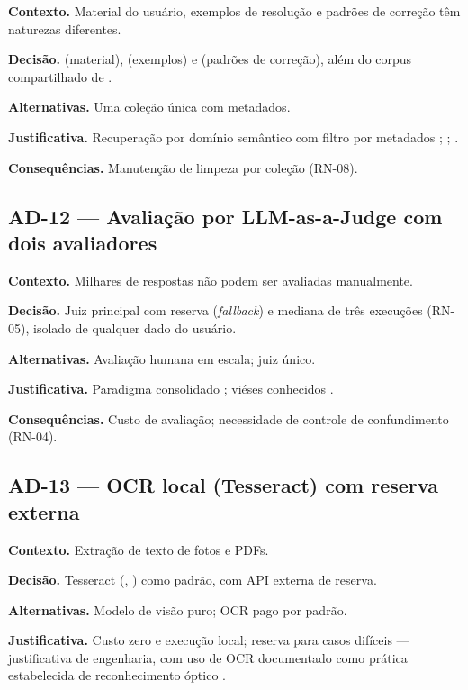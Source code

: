\textbf{Contexto.} Material do usuário, exemplos de resolução e padrões de correção têm naturezas diferentes.

\textbf{Decisão.} \texttt{} (material), \texttt{} (exemplos) e \texttt{} (padrões de correção), além do corpus compartilhado de \texttt{}.

\textbf{Alternativas.} Uma coleção única com metadados.

\textbf{Justificativa.} Recuperação por domínio semântico com filtro por metadados \cite{lewis_2020}; \cite{chromadb_2025}; \cite{kluibenschadl_2024_rag}.

\textbf{Consequências.} Manutenção de limpeza por coleção (RN-08).

\subsection{AD-12 --- Avaliação por LLM-as-a-Judge com dois avaliadores}

\textbf{Contexto.} Milhares de respostas não podem ser avaliadas manualmente.

\textbf{Decisão.} Juiz principal com reserva (\emph{fallback}) e mediana de três execuções (RN-05), isolado de qualquer dado do usuário.

\textbf{Alternativas.} Avaliação humana em escala; juiz único.

\textbf{Justificativa.} Paradigma consolidado \cite{zheng_2023}; viéses conhecidos \cite{wang_2023_not_fair}.

\textbf{Consequências.} Custo de avaliação; necessidade de controle de confundimento (RN-04).

\subsection{AD-13 --- OCR local (Tesseract) com reserva externa}

\textbf{Contexto.} Extração de texto de fotos e PDFs.

\textbf{Decisão.} Tesseract (\texttt{}, \texttt{}) como padrão, com API externa de reserva.

\textbf{Alternativas.} Modelo de visão puro; OCR pago por padrão.

\textbf{Justificativa.} Custo zero e execução local; reserva para casos difíceis --- justificativa de engenharia, com uso de OCR documentado como prática estabelecida de reconhecimento óptico \cite{smith_2007}.

